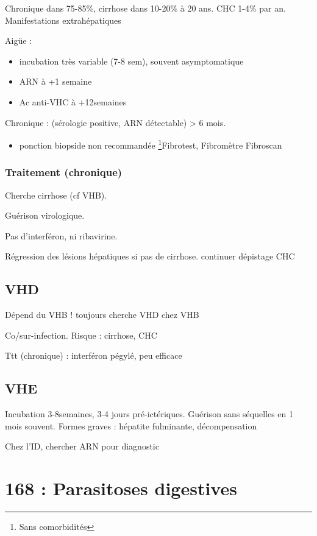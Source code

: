 \documentclass[11pt]{article}
\begin{document}
Chronique dans 75-85\%, cirrhose dans 10-20\% à 20 ans. CHC 1-4\% par an. Manifestations extrahépatiques

Aigüe : 
\begin{itemize}
\item incubation très variable (7-8 sem), souvent asymptomatique
\item ARN à +1 semaine
\item Ac anti-VHC à +12semaines
\end{itemize}

Chronique : (sérologie positive, ARN détectable) > 6 mois. 
\begin{itemize}
\item \danger ponction biopside non recommandée \footnote{Sans comorbidités}\thus Fibrotest, Fibromètre Fibroscan
\end{itemize}

\subsubsection{Traitement (chronique)}
\label{sec:org440df55}
Cherche cirrhose (cf VHB).

Guérison virologique.

Pas d'interféron, ni ribavirine.

Régression des lésions hépatiques si pas de cirrhose. \danger continuer
dépistage CHC

\subsection{VHD}
\label{sec:orga46f4c0}
Dépend du VHB !
\danger toujours cherche VHD chez VHB

Co/sur-infection. Risque : cirrhose, CHC

Ttt (chronique) : interféron pégylé, peu efficace

\subsection{VHE}
\label{sec:orgcc61a72}
Incubation 3-8semaines, 3-4 jours pré-ictériques.
Guérison sans séquelles en 1 mois souvent. Formes graves : hépatite fulminante, décompensation

Chez l'ID, chercher ARN pour diagnostic

\section{168 : Parasitoses digestives}
\label{sec:org39a7575}
\end{document}
